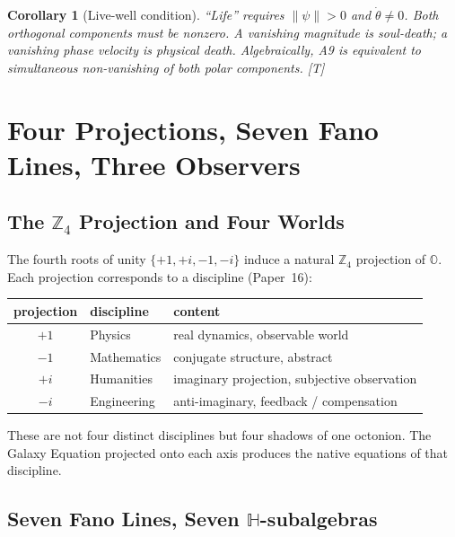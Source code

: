 \documentclass[11pt, a4paper]{article}
\newtheorem{corollary}{Corollary}
\newcommand{\Hq}{\mathbb{H}}
\newcommand{\Oct}{\mathbb{O}}
\newcommand{\norm}[1]{\lVert #1 \rVert}
\begin{document}
\begin{corollary}[Live-well condition]
\label{cor:45_balance}
``Life'' requires $\norm{\psi} > 0$ \emph{and} $\dot\theta \neq 0$.
Both orthogonal components must be nonzero. A vanishing magnitude
is soul-death; a vanishing phase velocity is physical death.
Algebraically, A9 is equivalent to simultaneous non-vanishing of
both polar components. [T]
\end{corollary}


\section{Four Projections, Seven Fano Lines, Three Observers}
\label{sec:fano}

\subsection{The $\mathbb{Z}_4$ Projection and Four Worlds}

The fourth roots of unity $\{+1, +i, -1, -i\}$ induce a natural
$\mathbb{Z}_4$ projection of $\Oct$. Each projection corresponds to
a discipline (Paper~16):

\begin{center}
\begin{tabular}{@{}cll@{}}
\toprule
projection & discipline & content \\
\midrule
$+1$ & Physics & real dynamics, observable world \\
$-1$ & Mathematics & conjugate structure, abstract \\
$+i$ & Humanities & imaginary projection, subjective observation \\
$-i$ & Engineering & anti-imaginary, feedback / compensation \\
\bottomrule
\end{tabular}
\end{center}

These are not four distinct disciplines but four shadows of one
octonion. The Galaxy Equation projected onto each axis produces the
native equations of that discipline.

\subsection{Seven Fano Lines, Seven $\Hq$-subalgebras}
\end{document}
